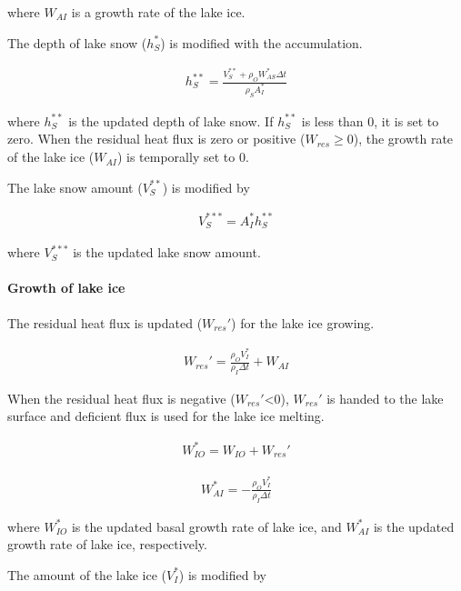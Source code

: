 where \(W_{AI}\) is a growth rate of the lake ice.

The depth of lake snow (\(h_S^{\ast}\)) is modified with the accumulation.

\begin{eqnarray}
  h_S^{\ast\ast} = \frac{V_S^{\ast\ast}+ \rho_O W_{AS}^\ast \Delta t}{\rho_S {A_I^\ast}}
\end{eqnarray}

where \(h_S^{\ast\ast}\) is the updated depth of lake snow. If \(h_S^{\ast\ast}\) is less than 0, it is set to zero. When the residual heat flux is zero or positive (\(W_{res}\ge 0\)), the growth rate
of the lake ice (\(W_{AI}\)) is temporally set to 0.

The lake snow amount (\(V_S^{\ast\ast}\)) is modified by

\begin{eqnarray}
    V_S^{\ast\ast\ast} = A_I^\ast h_S^{\ast\ast}
\end{eqnarray}

where \(V_S^{\ast\ast\ast}\) is the updated lake snow amount.

\hypertarget{growth-of-lake-ice}{%
\paragraph{Growth of lake ice}\label{growth-of-lake-ice}}

The residual heat flux is updated (\(W_{res}'\)) for the lake ice growing.

\begin{eqnarray}
    W_{res}' = \frac{\rho_OV_I^\ast}{\rho_I \Delta t}+ W_{AI}
\end{eqnarray}

When the residual heat flux is negative (\(W_{res}'\)\textless0), \(W_{res}'\) is handed to the lake surface and deficient flux is used for the lake ice melting.

\begin{eqnarray}
        W_{IO}^\ast = W_{IO} + W_{res}'
\end{eqnarray}

\begin{eqnarray}
    W_{AI}^\ast = - \frac{\rho_OV_I^{\ast}}{\rho_I \Delta t}
\end{eqnarray}

where \(W_{IO}^\ast\) is the updated basal growth rate of lake ice, and \(W_{AI}^\ast\) is the updated growth rate of lake ice, respectively.

The amount of the lake ice (\(V_I^{\ast}\)) is modified by

